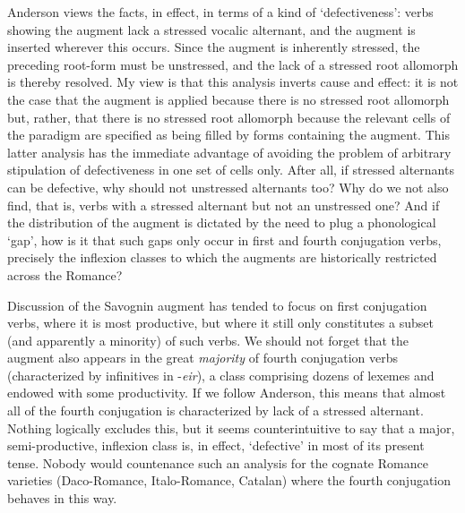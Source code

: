 \documentclass[output=paper,
modfonts
]{LSP/langsci}
\begin{document}
Anderson views the facts, in effect, in terms of a kind of
`defectiveness': verbs showing the augment lack a stressed vocalic
alternant, and the augment is inserted wherever this occurs. Since the
augment is inherently stressed, the preceding root-form must be
unstressed, and the lack of a stressed root allomorph is thereby
resolved. My view is that this analysis inverts cause and effect: it is
not the case that the augment is applied because there is no stressed
root allomorph but, rather, that there is no stressed root allomorph
because the relevant cells of the paradigm are specified as being filled
by forms containing the augment. This latter analysis has the immediate
advantage of avoiding the problem of arbitrary stipulation of
defectiveness in one set of cells only. After all, if stressed
alternants can be defective, why should not unstressed alternants too?
Why do we not also find, that is, verbs with a stressed alternant but
not an unstressed one? And if the distribution of the augment is
dictated by the need to plug a phonological `gap', how is it that such
gaps only occur in first and fourth conjugation verbs, precisely the
inflexion classes to which the augments are historically restricted
across the Romance?

Discussion of the Savognin augment has tended to focus on first
conjugation verbs, where it is most productive, but where it still only
constitutes a subset (and apparently a minority) of such verbs. We
should not forget that the augment also appears in the great
\emph{majority} of fourth conjugation verbs (characterized by
infinitives in -\emph{eir}), a class comprising dozens of lexemes and
endowed with some productivity. If we follow Anderson, this means that
almost all of the fourth conjugation is characterized by lack of a
stressed alternant. Nothing logically excludes this, but it seems
counterintuitive to say that a major, semi-productive, inflexion class
is, in effect, `defective' in most of its present tense. Nobody would
countenance such an analysis for the cognate Romance varieties
(Daco-Romance, Italo-Romance, Catalan) where the fourth conjugation
behaves in this way.
\end{document}
